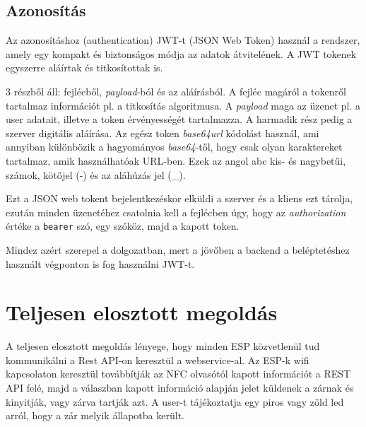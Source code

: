 \documentclass[
]{thesis-ekf}
\theoremstyle{definition}
\theoremstyle{remark}
\begin{document}
\section{Azonosítás}\label{auth}
Az azonosításhoz (authentication) JWT-t (JSON Web Token) használ a rendszer, amely egy kompakt és biztonságos módja az adatok átvitelének. A JWT tokenek egyszerre aláírtak és titkosítottak is.

3 részből áll: fejlécből, \emph{payload}-ból és az aláírásból.
A fejléc magáról a tokenről tartalmaz információt pl. a titkosítás algoritmusa. A \emph{payload} maga az üzenet pl. a user adatait, illetve a token érvényességét tartalmazza. A harmadik rész pedig a szerver digitális aláírása.
Az egész token \emph{base64url} kódolást használ, ami annyiban különbözik a hagyományos \emph{base64}-től, hogy csak olyan karaktereket tartalmaz, amik használhatóak URL-ben. Ezek az angol abc kis- és nagybetűi, számok, kötőjel (-) és az aláhúzás jel (\_). \cite{jwt-handbook}

Ezt a JSON web tokent bejelentkezéskor elküldi a szerver és a kliens ezt tárolja, ezután minden üzenetéhez csatolnia kell a fejlécben úgy, hogy az \emph{authorization} értéke a \texttt{bearer} szó, egy szóköz, majd a kapott token.

Mindez azért szerepel a dolgozatban, mert a jövőben a backend a beléptetéshez használt végponton is fog használni JWT-t.

\chapter{Teljesen elosztott megoldás}
A teljesen elosztott megoldás lényege, hogy minden ESP közvetlenül tud kommunikálni a Rest API-on keresztül a webservice-al. Az ESP-k wifi kapcsolaton keresztül továbbítják az NFC olvasótól kapott információt a REST API felé, majd a válaszban kapott információ alapján jelet küldenek a zárnak és kinyitják, vagy zárva tartják azt. A user-t tájékoztatja egy piros vagy zöld led arról, hogy a zár melyik állapotba került.
\end{document}
